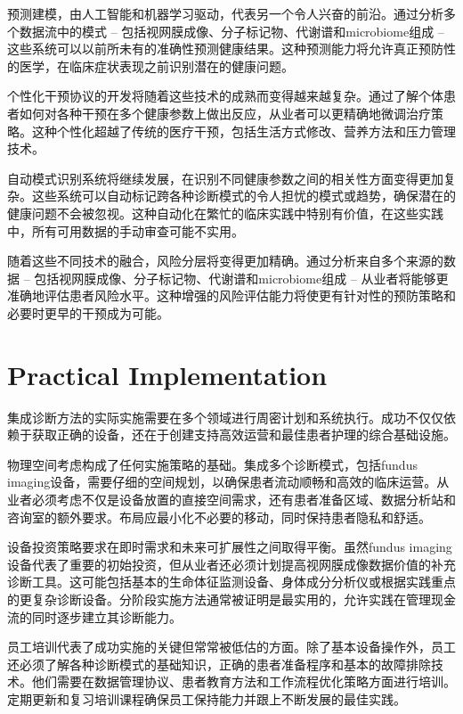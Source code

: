 \documentclass[
  Letterpaper,
]{scrbook}
\begin{document}
预测建模，由人工智能和机器学习驱动，代表另一个令人兴奋的前沿。通过分析多个数据流中的模式
-- 包括视网膜成像、分子标记物、代谢谱和microbiome组成 --
这些系统可以以前所未有的准确性预测健康结果。这种预测能力将允许真正预防性的医学，在临床症状表现之前识别潜在的健康问题。

个性化干预协议的开发将随着这些技术的成熟而变得越来越复杂。通过了解个体患者如何对各种干预在多个健康参数上做出反应，从业者可以更精确地微调治疗策略。这种个性化超越了传统的医疗干预，包括生活方式修改、营养方法和压力管理技术。

自动模式识别系统将继续发展，在识别不同健康参数之间的相关性方面变得更加复杂。这些系统可以自动标记跨各种诊断模式的令人担忧的模式或趋势，确保潜在的健康问题不会被忽视。这种自动化在繁忙的临床实践中特别有价值，在这些实践中，所有可用数据的手动审查可能不实用。

随着这些不同技术的融合，风险分层将变得更加精确。通过分析来自多个来源的数据
-- 包括视网膜成像、分子标记物、代谢谱和microbiome组成 --
从业者将能够更准确地评估患者风险水平。这种增强的风险评估能力将使更有针对性的预防策略和必要时更早的干预成为可能。

\section{Practical Implementation}\label{practical-implementation}

集成诊断方法的实际实施需要在多个领域进行周密计划和系统执行。成功不仅仅依赖于获取正确的设备，还在于创建支持高效运营和最佳患者护理的综合基础设施。

物理空间考虑构成了任何实施策略的基础。集成多个诊断模式，包括fundus
imaging设备，需要仔细的空间规划，以确保患者流动顺畅和高效的临床运营。从业者必须考虑不仅是设备放置的直接空间需求，还有患者准备区域、数据分析站和咨询室的额外要求。布局应最小化不必要的移动，同时保持患者隐私和舒适。

设备投资策略要求在即时需求和未来可扩展性之间取得平衡。虽然fundus
imaging设备代表了重要的初始投资，但从业者还必须计划提高视网膜成像数据价值的补充诊断工具。这可能包括基本的生命体征监测设备、身体成分分析仪或根据实践重点的更复杂诊断设备。分阶段实施方法通常被证明是最实用的，允许实践在管理现金流的同时逐步建立其诊断能力。

员工培训代表了成功实施的关键但常常被低估的方面。除了基本设备操作外，员工还必须了解各种诊断模式的基础知识，正确的患者准备程序和基本的故障排除技术。他们需要在数据管理协议、患者教育方法和工作流程优化策略方面进行培训。定期更新和复习培训课程确保员工保持能力并跟上不断发展的最佳实践。
\end{document}
